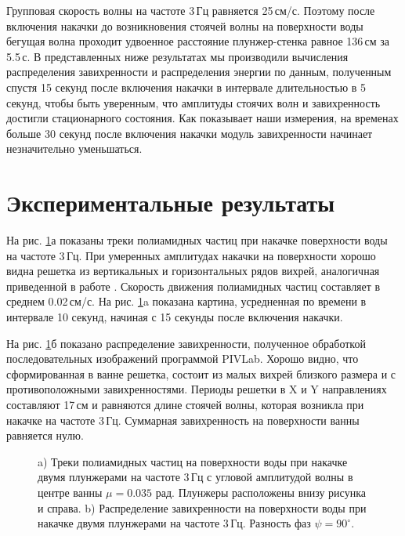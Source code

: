 Групповая скорость волны на частоте 3\,Гц равняется 25\,см/с. Поэтому после включения накачки до возникновения стоячей волны на поверхности воды бегущая волна проходит удвоенное расстояние плунжер-стенка равное 136\,см за 5.5\,с. В представленных ниже результатах мы производили вычисления распределения завихренности и распределения энергии по данным, полученным спустя 15 секунд после включения накачки в интервале длительностью в 5 секунд, чтобы быть уверенным, что амплитуды стоячих волн и завихренность достигли стационарного состояния. Как показывает наши измерения, на временах больше 30 секунд после включения накачки модуль завихренности начинает незначительно уменьшаться. 



\section{Экспериментальные результаты} \label{sect4_3}
На рис. \ref{img:vort_3Hz}а показаны треки полиамидных частиц при накачке поверхности воды на частоте 3\,Гц. При умеренных амплитудах накачки на поверхности хорошо видна решетка из вертикальных и горизонтальных рядов вихрей, аналогичная приведенной в работе \cite{kameke}. Скорость движения полиамидных частиц составляет в среднем 0.02\,см/с. На рис. \ref{img:vort_3Hz}a показана картина, усредненная по времени в интервале 10 секунд, начиная с 15 секунды после включения накачки.


На рис. \ref{img:vort_3Hz}б показано распределение завихренности, полученное обработкой последовательных изображений программой PIVLab. Хорошо видно, что сформированная в ванне решетка, состоит из малых вихрей близкого размера и с противоположными завихренностями. Периоды решетки в X и Y направлениях составляют 17\,см и равняются длине стоячей волны, которая возникла при накачке на частоте 3\,Гц. Суммарная завихренность на поверхности ванны равняется нулю. 

\begin{figure}[ht]
  \begin{minipage}[ht]{0.49\linewidth}
  \end{minipage}
  \hfill
  \begin{minipage}[ht]{0.49\linewidth}
  \end{minipage}
  \caption{a) Треки полиамидных частиц на поверхности воды при накачке двумя плунжерами на частоте 3\,Гц с угловой амплитудой волны в центре ванны $\mu = 0.035$ рад. Плунжеры расположены внизу рисунка и справа. b) Распределение завихренности на поверхности воды при накачке двумя плунжерами на частоте 3\,Гц. Разность фаз $\psi = 90^\circ$.}
  \label{img:vort_3Hz}  
\end{figure}



